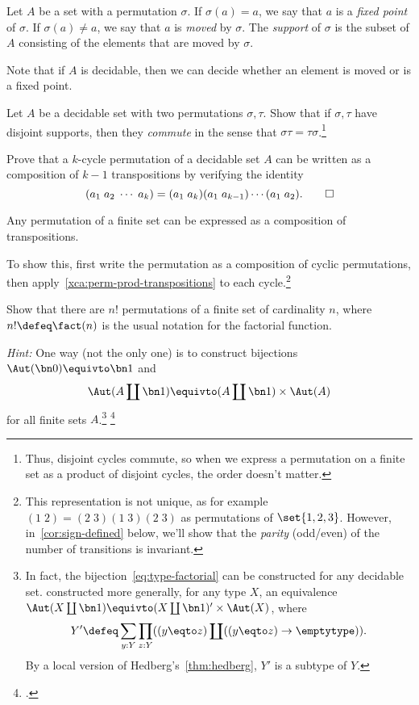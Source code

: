\begin{definition}\label{def:support-permutation}
  Let $A$ be a set with a permutation $\sigma$.
  If $\sigma(a)=a$, we say that $a$ is a \emph{fixed point} of $\sigma$.
  If $\sigma(a)\ne a$, we say that $a$ is \emph{moved} by $\sigma$.
  The \emph{support} of $\sigma$ is the subset of $A$
  consisting of the elements that are moved by $\sigma$.
\end{definition}
Note that if $A$ is decidable, then we can decide whether an element is moved or is a fixed point.

\begin{xca}
  Let $A$ be a decidable set with two permutations $\sigma,\tau$.
  Show that if $\sigma,\tau$ have disjoint supports,
  then they \emph{commute} in the sense that $\sigma\tau=\tau\sigma$.\footnote{%
    Thus, disjoint cycles commute, so when we express a permutation
    on a finite set as a product of disjoint cycles, the order doesn't matter.}
\end{xca}
\begin{xca}\label{xca:perm-prod-transpositions}
  Prove that a $k$-cycle permutation of a decidable set $A$ can be written
  as a composition of $k-1$ transpositions by verifying the identity
  \[
    (a_1\; a_2\; \cdots\; a_k) = (a_1\; a_k)(a_1\;a_{k-1})\cdots(a_1\;a_2).
    \qedhere
  \]
\end{xca}
\begin{corollary}
  Any permutation of a finite set can be expressed as
  a composition of transpositions.
\end{corollary}
To show this, first write the permutation as a composition of cyclic permutations,
then apply~\cref{xca:perm-prod-transpositions} to each cycle.\footnote{%
  This representation is not unique, as for example $(1\;2)=(2\;3)(1\;3)(2\;3)$
  as permutations of $\set{1,2,3}$.
  However, in~\cref{cor:sign-defined} below, we'll show that 
  the \emph{parity} (odd/even) of the number of transitions is invariant.}

\begin{xca}
  Show that there are $n!$ permutations of a finite set of cardinality $n$, where $n! \defeq \fact(n)$ is the usual notation for the factorial function.

  \emph{Hint:} One way (not the only one) is to construct bijections
  $\Aut(\bn 0) \equivto \bn 1$ and
  \begin{equation}\label{eq:type-factorial}
    \Aut(A \coprod \bn 1) \equivto (A \coprod \bn 1) \times \Aut(A)
  \end{equation}
  for all finite sets $A$.\footnote{%
    In fact, the bijection~\eqref{eq:type-factorial}
    can be constructed for any decidable set.
    \citeauthor{EscardoFactorial}\footnotemark{} constructed more generally,
    for any type $X$, an equivalence
    $\Aut(X \coprod \bn 1) \equivto (X \coprod \bn 1)' \times \Aut(X)$,
    where
    \[
      Y' \defeq 
      \sum_{y : Y}\prod_{z : Y}((y \eqto z) \coprod ((y \eqto z)\to\emptytype)).
    \]
    By a local version of Hedberg's~\cref{thm:hedberg},
    $Y'$ is a subtype of $Y$.}%
  \footcitetext{EscardoFactorial}
\end{xca}

